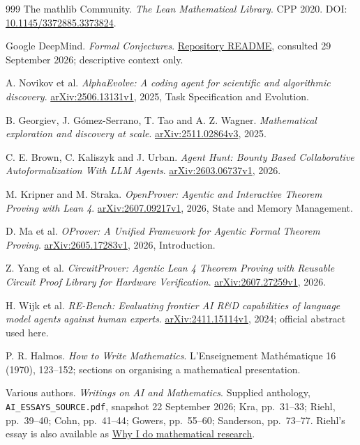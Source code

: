 \documentclass[10pt]{article}
\begin{document}
\begin{thebibliography}{999}
 The mathlib Community. \emph{The Lean Mathematical Library}.
CPP 2020. DOI: \href{https://doi.org/10.1145/3372885.3373824}{10.1145/3372885.3373824}.

 Google DeepMind. \emph{Formal Conjectures}.
\href{https://github.com/google-deepmind/formal-conjectures}{Repository README}, consulted 29 September 2026; descriptive context only.

 A. Novikov et al. \emph{AlphaEvolve: A coding agent for scientific and algorithmic discovery}.
\href{https://arxiv.org/abs/2506.13131v1}{arXiv:2506.13131v1}, 2025, Task Specification and Evolution.

 B. Georgiev, J. G\'omez-Serrano, T. Tao and A. Z. Wagner.
\emph{Mathematical exploration and discovery at scale}.
\href{https://arxiv.org/abs/2511.02864v3}{arXiv:2511.02864v3}, 2025.

 C. E. Brown, C. Kaliszyk and J. Urban.
\emph{Agent Hunt: Bounty Based Collaborative Autoformalization With LLM Agents}.
\href{https://arxiv.org/abs/2603.06737v1}{arXiv:2603.06737v1}, 2026.

 M. Kripner and M. Straka.
\emph{OpenProver: Agentic and Interactive Theorem Proving with Lean 4}.
\href{https://arxiv.org/abs/2607.09217v1}{arXiv:2607.09217v1}, 2026, State and Memory Management.

 D. Ma et al. \emph{OProver: A Unified Framework for Agentic Formal Theorem Proving}.
\href{https://arxiv.org/abs/2605.17283v1}{arXiv:2605.17283v1}, 2026, Introduction.

 Z. Yang et al.
\emph{CircuitProver: Agentic Lean 4 Theorem Proving with Reusable Circuit Proof Library for Hardware Verification}.
\href{https://arxiv.org/abs/2607.27259v1}{arXiv:2607.27259v1}, 2026.

 H. Wijk et al. \emph{RE-Bench: Evaluating frontier AI R\&D capabilities of language model agents against human experts}.
\href{https://arxiv.org/abs/2411.15114v1}{arXiv:2411.15114v1}, 2024; official abstract used here.

 P. R. Halmos. \emph{How to Write Mathematics}.
L'Enseignement Math\'ematique 16 (1970), 123--152; sections on organising a mathematical presentation.

 Various authors. \emph{Writings on AI and Mathematics}.
Supplied anthology, \texttt{AI\_ESSAYS\_SOURCE.pdf}, snapshot 22 September 2026;
Kra, pp.\ 31--33; Riehl, pp.\ 39--40; Cohn, pp.\ 41--44;
Gowers, pp.\ 55--60; Sanderson, pp.\ 73--77.
Riehl's essay is also available as
\href{https://terrytao.wordpress.com/2026/09/14/why-i-do-mathematical-research/}{Why I do mathematical research}.


\end{thebibliography}
\end{document}
